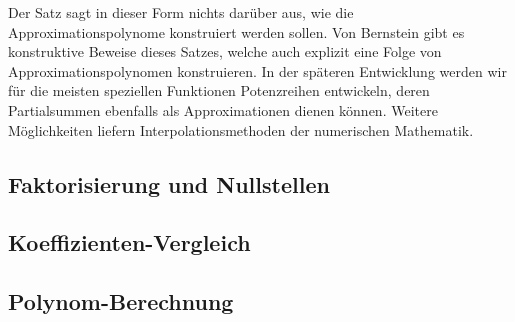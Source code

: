 Der Satz sagt in dieser Form nichts darüber aus, wie die
Approximationspolynome konstruiert werden sollen.
Von Bernstein gibt es konstruktive Beweise dieses Satzes,
welche auch explizit eine Folge von Approximationspolynomen
konstruieren.
In der späteren Entwicklung werden wir für die meisten
speziellen Funktionen Potenzreihen entwickeln, deren Partialsummen
ebenfalls als Approximationen dienen können.
Weitere Möglichkeiten liefern Interpolationsmethoden der
numerischen Mathematik.

\subsection{Faktorisierung und Nullstellen}

\subsection{Koeffizienten-Vergleich}

\subsection{Polynom-Berechnung}

